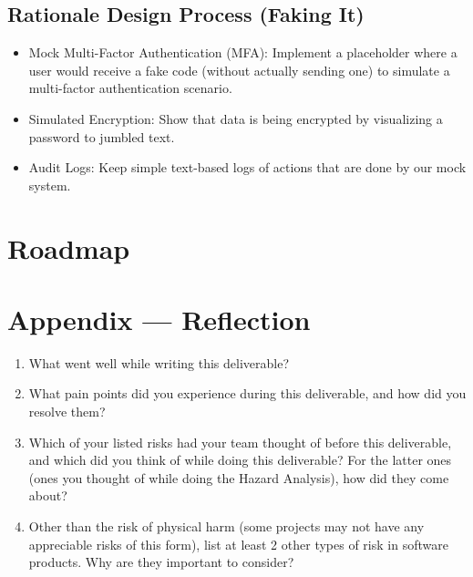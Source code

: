 \documentclass{article}
\begin{document}
\subsection{Rationale Design Process (Faking It)}
\begin{itemize}
    \item Mock Multi-Factor Authentication (MFA): Implement a placeholder where a user would receive a fake code (without actually sending one) to simulate a multi-factor authentication scenario.
    \item Simulated Encryption: Show that data is being encrypted by visualizing a password to jumbled text. 
    \item Audit Logs: Keep simple text-based logs of actions that are done by our mock system.
\end{itemize}

\section{Roadmap}


\newpage{}

\section*{Appendix --- Reflection}




\begin{enumerate}
    \item What went well while writing this deliverable? 
    \item What pain points did you experience during this deliverable, and how
    did you resolve them?
    \item Which of your listed risks had your team thought of before this
    deliverable, and which did you think of while doing this deliverable? For
    the latter ones (ones you thought of while doing the Hazard Analysis), how
    did they come about?
    \item Other than the risk of physical harm (some projects may not have any
    appreciable risks of this form), list at least 2 other types of risk in
    software products. Why are they important to consider?
\end{enumerate}
\end{document}
